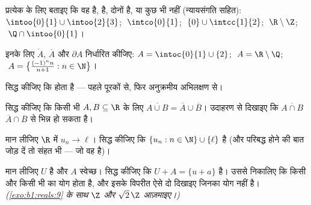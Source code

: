 \begin{exercise}[$\star$]\label{exo:b1:topology:1}
प्रत्येक  के लिए बताइए कि वह  है,  है, दोनों है, या कुछ भी
नहीं (न्यायसंगति सहित): $\intoo{0}{1} \cup \intoo{2}{3}$; $\;\intco{0}{1}$;
$\;\{0\} \cup \intcc{1}{2}$; $\;\R \setminus \Z$; $\;\Q \cap \intoo{0}{1}$।
\end{exercise}

\begin{exercise}[$\star$]\label{exo:b1:topology:2}
इनके लिए $\mathring A$, $\overline A$ और $\partial A$ निर्धारित कीजिए: $A =
\intoc{0}{1} \cup \{2\}$; $\;A = \R \setminus \Q$; $\;A =
\bigl\{\frac{(-1)^n n}{n+1} : n \in \N\bigr\}$।
\end{exercise}

\begin{exercise}[$\star$]\label{exo:b1:topology:3}
सिद्ध कीजिए कि   होता है --- पहले पूरकों से, फिर
अनुक्रमीय अभिलक्षण से।
\end{exercise}

\begin{exercise}[$\star$]\label{exo:b1:topology:4}
सिद्ध कीजिए कि किसी भी $A, B \subseteq \R$ के लिए $\overline{A \cup B} =
\overline A \cup \overline B$। उदाहरण से दिखाइए कि $\overline{A \cap B}$
$\overline A \cap \overline B$ से भिन्न हो सकता है।
\end{exercise}

\begin{exercise}[$\star\star$]\label{exo:b1:topology:5}
मान लीजिए $\R$ में $u_n \to \ell$। सिद्ध कीजिए कि  $\{u_n : n \in
\N\} \cup \{\ell\}$  है (और परिबद्ध होने की बात जोड़ दें तो संहत भी ---
जो वह है)।
\end{exercise}

\begin{exercise}[$\star\star$]\label{exo:b1:topology:6}
मान लीजिए $U$  है और $A$ स्वेच्छ। सिद्ध कीजिए कि $U + A = \{u + a\}$
 है। उससे निकालिए कि किसी  और किसी भी  का योग 
होता है, और इसके विपरीत ऐसे दो \emph{}  दिखाइए जिनका योग 
नहीं है। \emph{(\cref{exo:b1:reals:9} के साथ $\Z$ और $\sqrt 2\,\Z$
आज़माइए।)}
\end{exercise}


